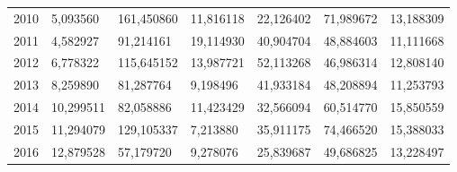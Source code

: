 \begin{table}
\begin{tabular}{p{1cm}p{2cm}p{2cm}p{2cm}p{2cm}p{2cm}p{2cm}}
 2010 &                               5,093560 & 161,450860 &    11,816118 &                         22,126402 &                   71,989672 &                                   13,188309 \\
 2011 &                               4,582927 &  91,214161 &    19,114930 &                         40,904704 &                   48,884603 &                                   11,111668 \\
 2012 &                               6,778322 & 115,645152 &    13,987721 &                         52,113268 &                   46,986314 &                                   12,808140 \\
 2013 &                               8,259890 &  81,287764 &     9,198496 &                         41,933184 &                   48,208894 &                                   11,253793 \\
 2014 &                              10,299511 &  82,058886 &    11,423429 &                         32,566094 &                   60,514770 &                                   15,850559 \\
 2015 &                              11,294079 & 129,105337 &     7,213880 &                         35,911175 &                   74,466520 &                                   15,388033 \\
 2016 &                              12,879528 &  57,179720 &     9,278076 &                         25,839687 &                   49,686825 &                                   13,228497 \\
\bottomrule
\end{tabular}
\end{table}
